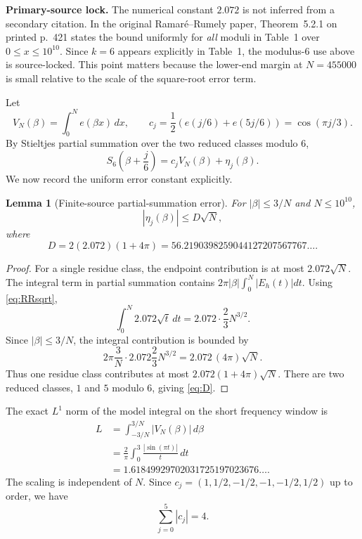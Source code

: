 \documentclass[11pt]{article}
\newtheorem{lemma}[theorem]{Lemma}
\theoremstyle{definition}
\newcommand{\abs}[1]{\left|#1\right|}
\begin{document}
\medskip
\noindent\textbf{Primary-source lock.} The numerical constant $2.072$ is not inferred from a secondary citation. In the original Ramar\'{e}--Rumely paper, Theorem~5.2.1 on printed p.~421 states the bound uniformly for \emph{all} moduli in Table~1 over $0\le x\le10^{10}$. Since $k=6$ appears explicitly in Table~1, the modulus-$6$ use above is source-locked. This point matters because the lower-end margin at $N=455000$ is small relative to the scale of the square-root error term.


Let
\[
V_N(\beta)=\int_0^N e(\beta x)\,dx,
\qquad
c_j=\frac12\left(e(j/6)+e(5j/6)\right)=\cos(\pi j/3).
\]
By Stieltjes partial summation over the two reduced classes modulo $6$,
\begin{equation}\label{eq:approxS}
S_6\!\left(\beta+\frac j6\right)
=c_jV_N(\beta)+\eta_j(\beta).
\end{equation}
We now record the uniform error constant explicitly.

\begin{lemma}[Finite-source partial-summation error]\label{lem:D}
For $\abs{\beta}\le3/N$ and $N\le10^{10}$,
\[
\abs{\eta_j(\beta)}\le D\sqrt N,
\]
where
\begin{equation}\label{eq:D}
\boxed{
D=2(2.072)(1+4\pi)
=56.2190398259044127207567767\ldots.
}
\end{equation}
\end{lemma}
\begin{proof}
For a single residue class, the endpoint contribution is at most $2.072\sqrt N$. The integral term in partial summation contains $2\pi\abs{\beta}\int_0^N\abs{E_h(t)}dt$. Using \eqref{eq:RRsqrt},
\[
\int_0^N2.072\sqrt t\,dt
=2.072\cdot\frac23N^{3/2}.
\]
Since $\abs{\beta}\le3/N$, the integral contribution is bounded by
\[
2\pi\frac3N\cdot2.072\frac23N^{3/2}
=2.072\,(4\pi)\sqrt N.
\]
Thus one residue class contributes at most $2.072(1+4\pi)\sqrt N$. There are two reduced classes, $1$ and $5$ modulo $6$, giving \eqref{eq:D}.
\end{proof}

The exact $L^1$ norm of the model integral on the short frequency window is
\begin{equation}\label{eq:L}
\begin{split}
L&=\int_{-3/N}^{3/N}\abs{V_N(\beta)}\,d\beta\\
&=\frac2\pi\int_0^3\frac{\abs{\sin(\pi t)}}{t}\,dt\\
&=1.61849929702031725197023676\ldots.
\end{split}
\end{equation}
The scaling is independent of $N$. Since $c_j=(1,1/2,-1/2,-1,-1/2,1/2)$ up to order, we have
\begin{equation}\label{eq:cjabs}
\sum_{j=0}^5\abs{c_j}=4.
\end{equation}
\end{document}
